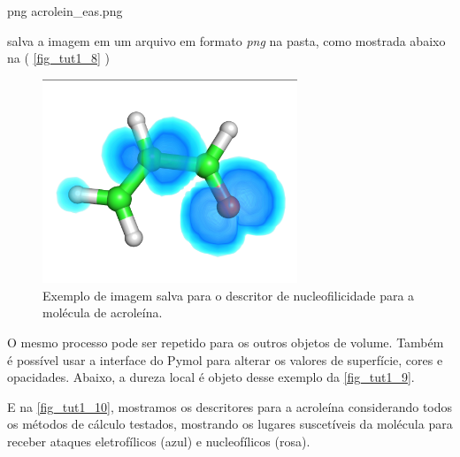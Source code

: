 \documentclass[a4paper,11pt]{refart}
\begin{document}
\hspace*{-\leftmarginwidth}
\begin{minipage}{\fullwidth}
	\begin{pymol}png acrolein_eas.png\end{pymol}
\end{minipage}

salva a imagem em um arquivo em formato \textit{png} na pasta, como mostrada abaixo na ( \autoref{fig_tut1_8} )


\hspace*{-\leftmarginwidth}
\begin{minipage}{\fullwidth}
\begin{figure}[H]
\begin{center}
\includegraphics[width=3in]{images/img9}
\caption{Exemplo de imagem salva para o descritor de nucleofilicidade para a molécula de acroleína.}
\label{fig_tut1_8}
\end{center}
\end{figure}
\end{minipage}

O mesmo processo pode ser repetido para os outros objetos de volume. Também é possível usar a interface do Pymol para alterar os valores de superfície, cores e opacidades. Abaixo, a dureza local é objeto desse exemplo da \autoref{fig_tut1_9}.

E na \autoref{fig_tut1_10}, mostramos os descritores para a acroleína considerando todos os métodos de cálculo testados, mostrando os lugares suscetíveis da molécula para receber ataques eletrofílicos (azul) e nucleofílicos (rosa).
\end{document}
